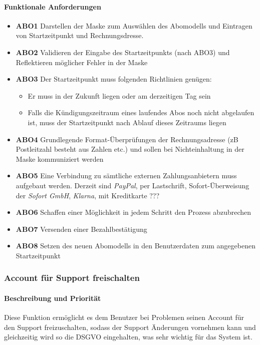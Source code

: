 \paragraph{Funktionale Anforderungen}
\begin{itemize}
	\item \textbf{ABO1} Darstellen der Maske zum Auswählen des Abomodells und Eintragen von Startzeitpunkt und Rechnungsdresse.
	\item \textbf{ABO2} Validieren der Eingabe des Startzeitpunkts (nach ABO3) und Reflektieren möglicher Fehler in der Maske
	\item \textbf{ABO3} Der Startzeitpunkt muss folgenden Richtlinien genügen:
	      \begin{itemize}
		      \item Er muss in der Zukunft liegen oder am derzeitigen Tag sein
		      \item Falls die Kündigungszeitraum eines laufendes Abos noch nicht abgelaufen ist, muss der Startzeitpunkt nach Ablauf dieses Zeitraums liegen
	      \end{itemize}
	\item \textbf{ABO4} Grundlegende Format-Überprüfungen der Rechnungsadresse (zB Postleitzahl besteht aus Zahlen etc.) und sollen bei Nichteinhaltung in der Maske kommuniziert werden
	\item \textbf{ABO5} Eine Verbindung zu sämtliche externen Zahlungsanbietern muss aufgebaut werden. Derzeit sind \textit{PayPal}, per Lastschrift, Sofort-Überweisung der \textit{Sofort GmbH}, \textit{Klarna}, mit Kreditkarte ???
	\item \textbf{ABO6} Schaffen einer Möglichkeit in jedem Schritt den Prozess abzubrechen
	\item \textbf{ABO7} Versenden einer Bezahlbestätigung
	\item \textbf{ABO8} Setzen des neuen Abomodells in den Benutzerdaten zum angegebenen Startzeitpunkt
\end{itemize}

\subsubsection{Account für Support freischalten}
\label{sys_feat:freischalten}
\paragraph{Beschreibung und Priorität}
Diese Funktion ermöglicht es dem Benutzer bei Problemen seinen Account für den Support freizuschalten, sodass der Support Änderungen vornehmen kann und gleichzeitig wird so die DSGVO eingehalten, was sehr wichtig für das System ist.

